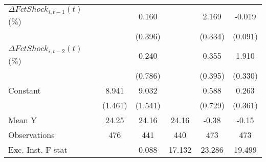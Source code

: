 {\begin{tabular}{l*{5}{c}}
\addlinespace
$ \Delta FctShock_{i,t-1}(t)$ (\%)&                     &       0.160         &                     &       2.169\sym{***}&      -0.019         \\
                    &                     &     (0.396)         &                     &     (0.334)         &     (0.091)         \\
\addlinespace
$ \Delta FctShock_{i,t-2}(t)$ (\%)&                     &       0.240         &                     &       0.355         &       1.910\sym{***}\\
                    &                     &     (0.786)         &                     &     (0.395)         &     (0.330)         \\
\addlinespace
Constant            &       8.941\sym{***}&       9.032\sym{***}&                     &       0.588         &       0.263         \\
                    &     (1.461)         &     (1.541)         &                     &     (0.729)         &     (0.361)         \\
\midrule
Mean Y              &       24.25         &       24.16         &       24.16         &       -0.38         &       -0.15         \\
Observations        &         476         &         441         &         440         &         473         &         473         \\
Exc. Inst. F-stat   &                     &       0.088         &      17.132         &      23.286         &      19.499         \\
\bottomrule
\end{tabular}
}
